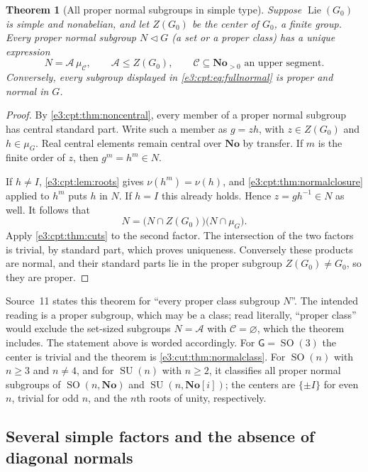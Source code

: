 \documentclass[11pt,letterpaper]{article}
\numberwithin{equation}{section}
\newtheorem{theorem}{Theorem}[section]
\theoremstyle{definition}
\theoremstyle{remark}
\newcommand{\No}{\mathbf{No}}
\newcommand{\SO}{\operatorname{SO}}
\newcommand{\SU}{\operatorname{SU}}
\newcommand{\Lie}{\operatorname{Lie}}
\newcommand{\sG}{\mathsf G}
\begin{document}
\begin{theorem}[All proper normal subgroups in simple type]\label{e3:cpt:thm:fullnormal}
Suppose $\Lie(G_0)$ is simple and nonabelian, and let $Z(G_0)$ be the center of
$G_0$, a finite group. Every proper normal subgroup $N\lhd G$ \textup(a set or a
proper class\textup) has a unique expression
\begin{equation}\label{e3:cpt:eq:fullnormal}
 N=\mathcal A\,\mu_{\mathcal C},
 \qquad \mathcal A\le Z(G_0),
 \qquad\mathcal C\subseteq\No_{>0}\text{ an upper segment}.
\end{equation}
Conversely, every subgroup displayed in \cref{e3:cpt:eq:fullnormal} is proper
and normal in $G$.
\end{theorem}
\begin{proof}
By \cref{e3:cpt:thm:noncentral}, every member of a proper normal subgroup has
central standard part. Write such a member as $g=zh$, with $z\in Z(G_0)$ and
$h\in\mu_G$. Real central elements remain central over $\No$ by transfer. If
$m$ is the finite order of $z$, then $g^m=h^m\in N$.

If $h\ne I$, \cref{e3:cpt:lem:roots} gives $\nu(h^m)=\nu(h)$, and
\cref{e3:cpt:thm:normalclosure} applied to $h^m$ puts $h$ in $N$. If $h=I$ this
already holds. Hence $z=gh^{-1}\in N$ as well. It follows that
\[
 N=\bigl(N\cap Z(G_0)\bigr)\bigl(N\cap\mu_G\bigr).
\]
Apply \cref{e3:cpt:thm:cuts} to the second factor. The intersection of the two
factors is trivial, by standard part, which proves uniqueness. Conversely these
products are normal, and their standard parts lie in the proper subgroup
$Z(G_0)\ne G_0$, so they are proper.
\end{proof}

Source~11 states this theorem for ``every proper class subgroup $N$''. The
intended reading is a proper subgroup, which may be a class; read literally,
``proper class'' would exclude the set-sized subgroups $N=\mathcal A$ with
$\mathcal C=\varnothing$, which the theorem includes. The statement above is
worded accordingly. For $\sG=\SO(3)$ the center is trivial and the theorem is
\cref{e3:cut:thm:normalclass}. For $\SO(n)$ with $n\ge3$ and $n\ne4$, and for
$\SU(n)$ with $n\ge2$, it classifies all proper normal subgroups of
$\SO(n,\No)$ and $\SU(n,\No[i])$; the centers are $\{\pm I\}$ for even $n$,
trivial for odd $n$, and the $n$th roots of unity, respectively.

\subsection{Several simple factors and the absence of diagonal normals}
\end{document}
